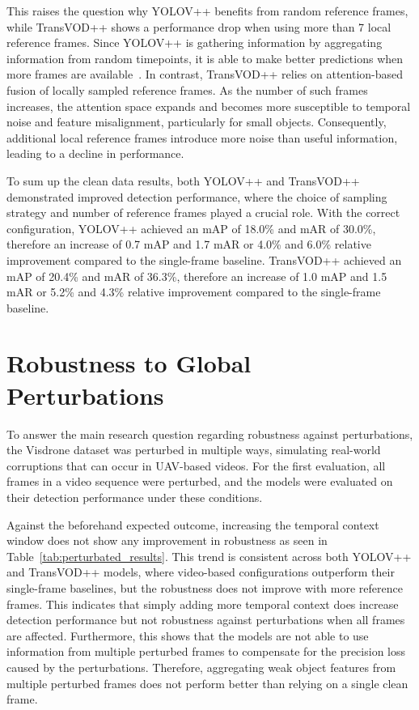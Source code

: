 \documentclass[final,twoside]{vutinfth}
\begin{document}
This raises the question why YOLOV++ benefits from random reference frames, while TransVOD++ shows a performance drop when using more than 7 local reference frames.
Since YOLOV++ is gathering information by aggregating information from random timepoints, it is able to make better predictions when more frames are available~\cite{shi2024yolovpp}.
In contrast, TransVOD++ relies on attention-based fusion of locally sampled reference frames. As the number of such frames increases, the attention space expands and becomes more susceptible to temporal noise and feature misalignment, particularly for small objects.
Consequently, additional local reference frames introduce more noise than useful information, leading to a decline in performance.

To sum up the clean data results, both YOLOV++ and TransVOD++ demonstrated improved detection performance, where the choice of sampling strategy and number of reference frames played a crucial role.
With the correct configuration, YOLOV++ achieved an mAP of 18.0\% and mAR of 30.0\%, therefore an increase of 0.7 mAP and 1.7 mAR or 4.0\% and 6.0\% relative improvement compared to the single-frame baseline.
TransVOD++ achieved an mAP of 20.4\% and mAR of 36.3\%, therefore an increase of 1.0 mAP and 1.5 mAR or 5.2\% and 4.3\% relative improvement compared to the single-frame baseline.
\section{Robustness to Global Perturbations}
To answer the main research question regarding robustness against perturbations, the Visdrone dataset was perturbed in multiple ways, simulating real-world corruptions that can occur in UAV-based videos.
For the first evaluation, all frames in a video sequence were perturbed, and the models were evaluated on their detection performance under these conditions.

Against the beforehand expected outcome, increasing the temporal context window does not show any improvement in robustness as seen in Table~\ref{tab:perturbated_results}.
This trend is consistent across both YOLOV++ and TransVOD++ models, where video-based configurations outperform their single-frame baselines, but the robustness does not improve with more reference frames.
This indicates that simply adding more temporal context does increase detection performance but not robustness against perturbations when all frames are affected.
Furthermore, this shows that the models are not able to use information from multiple perturbed frames to compensate for the precision loss caused by the perturbations.
Therefore, aggregating weak object features from multiple perturbed frames does not perform better than relying on a single clean frame.
\end{document}
